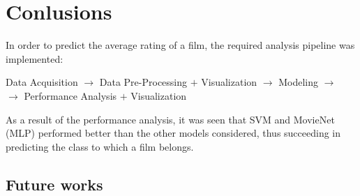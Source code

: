 \documentclass[../main]{subfiles}
\begin{document}
\chapter{Conlusions}
In order to predict the average rating of a film, the required analysis pipeline was implemented:
\begin{center}
    Data Acquisition $\rightarrow$ Data Pre-Processing $+$ Visualization $\rightarrow$ Modeling $\rightarrow$ \\ $\rightarrow$ Performance Analysis $+$ Visualization
\end{center}
As a result of the performance analysis, it was seen that SVM and MovieNet (MLP) performed better than the other models considered, thus succeeding in predicting the class to which a film belongs.

\section{Future works}
\end{document}
